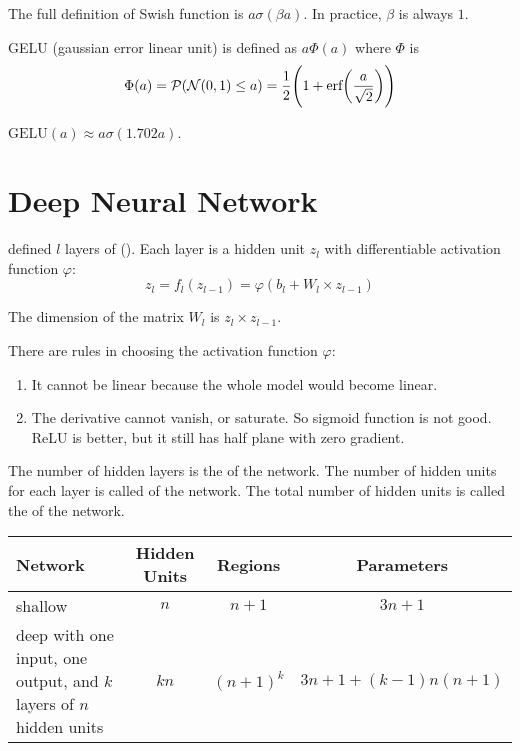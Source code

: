 \begin{example}[Swish]
    The full definition of Swish function is $a\sigma(\beta a)$. In practice, $\beta$ is always $1$. 
\end{example}

\begin{example}[GELU]
    GELU (gaussian error linear unit) is defined as $a \Phi(a)$ where $\Phi$ is
    \begin{equation}
        \Phi(a) = \mathcal{P}(\mathcal{N}(0,1) \leq a) = \frac{1}{2}\mleft(1+\text{erf}\mleft(\frac{a}{\sqrt{2}}\mright)\mright)
    \end{equation}
    
    $\text{GELU}(a) \approx a \sigma(1.702 a)$. 
\end{example}



\section{Deep Neural Network}

 defined $l$ layers of  (). Each layer is a hidden unit $z_l$ with differentiable activation function $\varphi$:
\begin{equation}
    z_l = f_l (z_{l-1}) = \varphi (b_l + W_l \times z_{l-1})
\end{equation}

The dimension of the matrix $W_l$ is $z_l \times z_{l-1}$.

There are rules in choosing the activation function $\varphi$:
\begin{enumerate}
    \item It cannot be linear because the whole model would become linear.
    \item The derivative cannot vanish, or saturate. So sigmoid function is not good. ReLU is better, but it still has half plane with zero gradient.
\end{enumerate}

The number of hidden layers is the  of the network. The number of hidden units for each layer is called  of the network. The total number of hidden units is called the  of the network.

\begin{table}[H]
\centering
\begin{tabular}[t]{p{5cm}ccc}
Network & Hidden Units & Regions & Parameters \\ \hline
shallow & $n$ & $n+1$ & $3n+1$\\
deep with one input, one output, and $k$ layers of $n$ hidden units & $k n$ & $(n+1)^k$ & $3n+1+(k-1)n(n+1)$ \\
\end{tabular}
\end{table}


